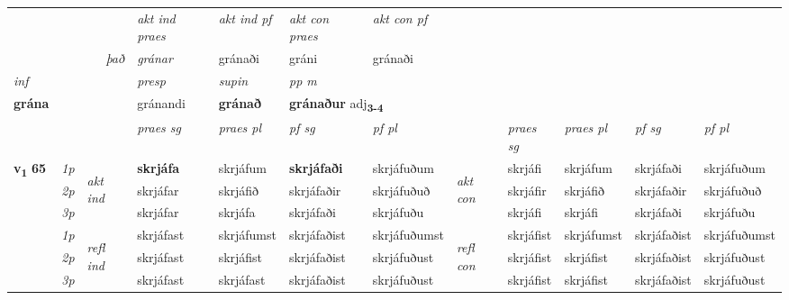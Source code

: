 \begin{longtable}[l]{X>{\footnotesize\itshape}llXXXXlXXXX}
   && &  \textit{akt ind praes} & \textit{akt ind pf} & \textit{akt con praes} & \textit{akt con pf} \\*
\multicolumn{3}{r}{\textit{það}} & gránar & gránaði & gráni & gránaði \\*

\cmidrule{4-7}
   {\textit{inf}} & &     & \textit{presp} & \textit{supin}  & \textit{pp m} \\*
  {\textbf{grána}} & &     & gránandi &  \textbf{gránað}  & \multicolumn{2}{l}{\textbf{gránaður} adj\textbf{\textsubscript{3-4}}} \\*

\midrule

 & &   & \textit{praes sg}  & \textit{praes pl}    & \textit{ pf sg} & \textit{pf pl} & & \textit{praes sg}  & \textit{praes pl}    & \textit{pf sg} & \textit{pf pl }  \\ \cmidrule{4-7} \cmidrule{9-12}
 \multirow{2}{*}{{{\textbf{v{\textsubscript{1}}} \Large{\textbf{65}}}}}  & 1p & \multirow{3}{*}{\begin{turn}{90}\textit{akt ind}\end{turn}} & \textbf{skrjáfa} & skrjáfum & \textbf{skrjáfaði} & skrjáfuðum & \multirow{3}{*}{\begin{turn}{90}\textit{akt con}\end{turn}} &skrjáfi & skrjáfum & skrjáfaði & skrjáfuðum\\*
 & 2p &  &  skrjáfar  & skrjáfið & skrjáfaðir & skrjáfuðuð & & skrjáfir & skrjáfið & skrjáfaðir & skrjáfuðuð \\*
 & 3p &  & skrjáfar & skrjáfa & skrjáfaði & skrjáfuðu & & skrjáfi & skrjáfi& skrjáfaði & skrjáfuðu \\*
\cmidrule{4-7} \cmidrule{9-12}
 & 1p & \multirow{3}{*}{\begin{turn}{90}\textit{refl ind}\end{turn}}  & skrjáfast & skrjáfumst & skrjáfaðist & skrjáfuðumst & \multirow{3}{*}{\begin{turn}{90}\textit{refl con}\end{turn}}  &skrjáfist & skrjáfumst & skrjáfaðist & skrjáfuðumst \\*
 & 2p &  & skrjáfast & skrjáfist & skrjáfaðist & skrjáfuðust & &skrjáfist & skrjáfist & skrjáfaðist & skrjáfuðust \\*
 & 3p  & & skrjáfast & skrjáfast & skrjáfaðist & skrjáfuðust & & skrjáfist & skrjáfist& skrjáfaðist & skrjáfuðust \\*
\cmidrule{4-7} \cmidrule{9-12}


\end{longtable}
